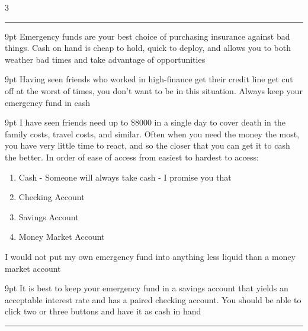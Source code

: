 \documentclass[landscape]{article}
\newcommand{\myline}{\vspace{4pt}\hrule  \vspace{4pt}}
\newcommand{\commasep}[1]{\num[group-separator={,}]{#1}}
\newcommand{\money}[1]{\$\commasep{#1}}
\newenvironment{topic}[1]{
	\noindent \textbf{\textsc{\color{harvardcrimson}{#1}}}
	\noindent \hspace{-3.5pt}
}{
	\myline
}
\newenvironment{prin}[1]{
	\noindent \textit{\color{black}{#1}}
	\begin{adjustwidth}{9pt}{}
		\color{dark-grey}
	}{
	\end{adjustwidth}
}
\newenvironment{compactenum}{
	\begin{enumerate}[leftmargin=*,labelsep=5pt]
	}{
	\end{enumerate}
}
\begin{document}
\begin{multicols*}{3}
\begin{topic}{Retirement Account Principals}
	\end{topic}\resetprincount
	
	\begin{topic}{Emergency Funds}
			
			\begin{prin}{Principal E\princount: The Principal of Emergency Funds: Emergency funds are your single largest priority until you get one - they are insurance on yourself} Emergency funds are your best choice of purchasing insurance against bad things. Cash on hand is cheap to hold, quick to deploy, and allows you to both weather bad times and take advantage of opportunities\end{prin}
			
			\begin{prin}{Principal E\princount: The Principal of Non-Emergency Credit: Emergency funds should never be ``credit lines'' including Home Equity lines, credit cards, etc.} Having seen friends who worked in high-finance get their credit line get cut off at the worst of times, you don't want to be in this situation. Always keep your emergency fund in cash\end{prin}
	
			\begin{prin}{Principal E\princount: The Principal of Emergency Fund Liquidity: Your emergency fund should be able to be at least 70\% convertible to cash in a day and 100\% by three days} I have seen friends need up to \money{8000} in a single day to cover death in the family costs, travel costs, and similar. Often when you need the money the most, you have very little time to react, and so the closer that you can get it to cash the better. In order of ease of access from easiest to hardest to access:
			\begin{compactenum}
				\item Cash - Someone will always take cash - I promise you that \item Checking Account \item Savings Account \item Money Market Account 
			\end{compactenum} I would not put my own emergency fund into anything less liquid than a money market account \end{prin}
	
			\begin{prin}{Principal E\princount: The Principal of Emergency Fund Interest: You don't care about interest on your emergency fund, you care about how quickly you can convert it to cash} It is best to keep your emergency fund in a savings account that yields an acceptable interest rate and has a paired checking account. You should be able to click two or three buttons and have it as cash in hand\end{prin}
	

\end{topic}
\end{multicols*}
\end{document}
